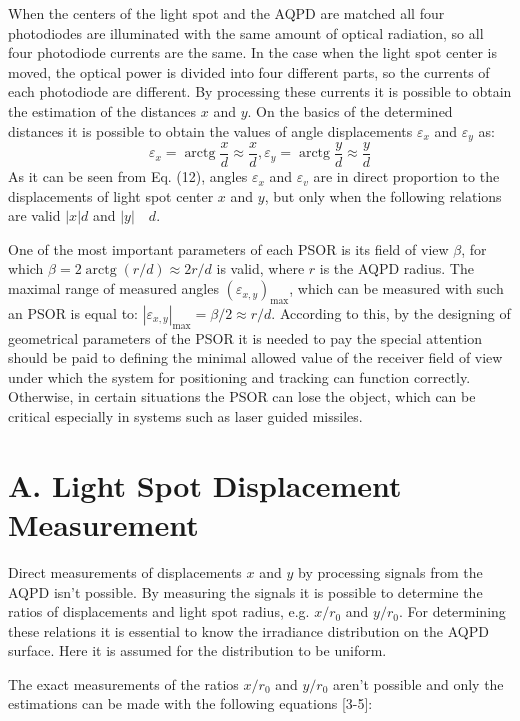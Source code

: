 \documentclass[10pt]{article}
\begin{document}
When the centers of the light spot and the AQPD are matched all four photodiodes are illuminated with the same amount of optical radiation, so all four photodiode currents are the same. In the case when the light spot center is moved, the optical power is divided into four different parts, so the currents of each photodiode are different. By processing these currents it is possible to obtain the estimation of the distances \(x\) and \(y\). On the basics of the determined distances it is possible to obtain the values of angle displacements \(\varepsilon_{x}\) and \(\varepsilon_{y}\) as:
\[
\varepsilon_{x}=\operatorname{arctg} \frac{x}{d} \approx \frac{x}{d}, \varepsilon_{y}=\operatorname{arctg} \frac{y}{d} \approx \frac{y}{d}
\]
As it can be seen from Eq. (12), angles \(\varepsilon_{x}\) and \(\varepsilon_{v}\) are in direct proportion to the displacements of light spot center \(x\) and \(y\), but only when the following relations are valid \(|x| d\) and \(|y| \quad d\).

One of the most important parameters of each PSOR is its field of view \(\beta\), for which \(\beta=2 \operatorname{arctg}(r / d) \approx 2 r / d\) is valid, where \(r\) is the AQPD radius. The maximal range of measured angles \(\left(\varepsilon_{x, y}\right)_{\max }\), which can be measured with such an PSOR is equal to: \(\left|\varepsilon_{x, y}\right|_{\max }=\beta / 2 \approx r / d\). According to this, by the designing of geometrical parameters of the PSOR it is needed to pay the special attention should be paid to defining the minimal allowed value of the receiver field of view under which the system for positioning and tracking can function correctly. Otherwise, in certain situations the PSOR can lose the object, which can be critical especially in systems such as laser guided missiles.

\section{A. Light Spot Displacement Measurement}
Direct measurements of displacements \(x\) and \(y\) by processing signals from the AQPD isn't possible. By measuring the signals it is possible to determine the ratios of displacements and light spot radius, e.g. \(x / r_{0}\) and \(y / r_{0} .\) For determining these relations it is essential to know the irradiance distribution on the AQPD surface. Here it is assumed for the distribution to be uniform.

The exact measurements of the ratios \(x / r_{0}\) and \(y / r_{0}\) aren't possible and only the estimations can be made with the following equations [3-5]:
\end{document}
